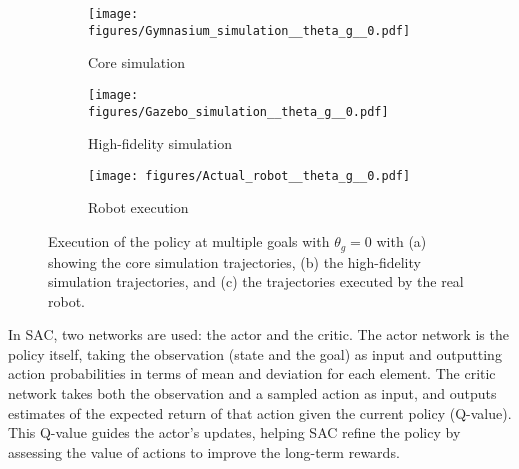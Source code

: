 \begin{figure*}
  \begin{subfigure}[b]{0.33\linewidth}
    \centering
    \texttt{[image: figures/Gymnasium\_simulation\_\_theta\_g\_\_0.pdf]}
    \caption{Core simulation} 
    \label{fig:policy_results_a} 
  \end{subfigure}%
  \begin{subfigure}[b]{0.33\linewidth}
    \centering
    \texttt{[image: figures/Gazebo\_simulation\_\_theta\_g\_\_0.pdf]} 
    \caption{High-fidelity simulation} 
    \label{fig:policy_results_b}
  \end{subfigure}%
 \begin{subfigure}[b]{0.33\linewidth}
    \centering
    \texttt{[image: figures/Actual\_robot\_\_theta\_g\_\_0.pdf]}
    \caption{Robot execution} 
    \label{fig:policy_results_c} 
  \end{subfigure}%
  \caption{Execution of the policy at multiple goals with $\theta_g = 0$ with (a) showing the core simulation trajectories, (b) the high-fidelity simulation trajectories, and (c) the trajectories executed by the real robot.}
  \label{fig:policy_results} 
\end{figure*}
In SAC, two networks are used: the actor and the critic. The actor network is the policy itself, taking the observation (state and the goal) as input and outputting action probabilities in terms of mean and deviation for each element. The critic network takes both the observation and a sampled action as input, and outputs estimates of the expected return of that action given the current policy (Q-value). This Q-value guides the actor’s updates, helping SAC refine the policy by assessing the value of actions to improve the long-term rewards.

